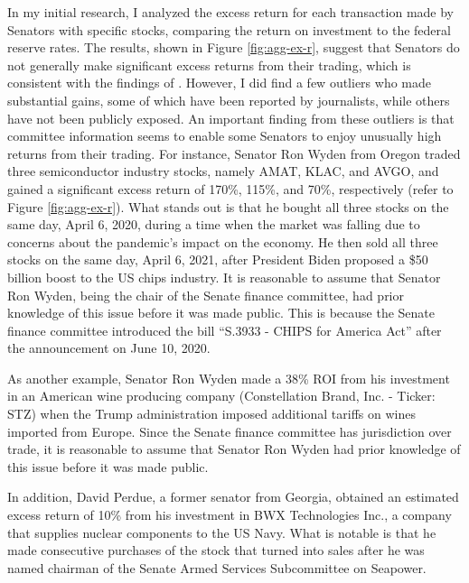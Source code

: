 \documentclass[15pt,letterpaper]{article}
\begin{document}
In my initial research, I analyzed the excess return for each transaction made by Senators with specific stocks, comparing the return on investment to the federal reserve rates. The results, shown in Figure \ref{fig:agg-ex-r}, suggest that Senators do not generally make significant excess returns from their trading, which is consistent with the findings of \cite{eg13}. However, I did find a few outliers who made substantial gains, some of which have been reported by journalists, while others have not been publicly exposed. An important finding from these outliers is that committee information seems to enable some Senators to enjoy unusually high returns from their trading. 
For instance, Senator Ron Wyden from Oregon traded three semiconductor industry stocks, namely AMAT, KLAC, and AVGO, and gained a significant excess return of 170\%, 115\%, and 70\%, respectively (refer to Figure \ref{fig:agg-ex-r}). What stands out is that he bought all three stocks on the same day, April 6, 2020, during a time when the market was falling due to concerns about the pandemic's impact on the economy. He then sold all three stocks on the same day, April 6, 2021, after President Biden proposed a \$50 billion boost to the US chips industry. It is reasonable to assume that Senator Ron Wyden, being the chair of the Senate finance committee, had prior knowledge of this issue before it was made public. This is because the Senate finance committee introduced the bill ``S.3933 - CHIPS for America Act'' after the announcement on June 10, 2020.

As another example, Senator Ron Wyden made a 38\% ROI from his investment in an American wine producing company (Constellation Brand, Inc. - Ticker: STZ) when the Trump administration imposed additional tariffs on wines imported from Europe.
Since the Senate finance committee has jurisdiction over trade, it is reasonable to assume that Senator Ron Wyden had prior knowledge of this issue before it was made public.

In addition, David Perdue, a former senator from Georgia, obtained an estimated excess return of 10\% from his investment in BWX Technologies Inc., a company that supplies nuclear components to the US Navy. What is notable is that he made consecutive purchases of the stock that turned into sales after he was named chairman of the Senate Armed Services Subcommittee on Seapower.
\end{document}
